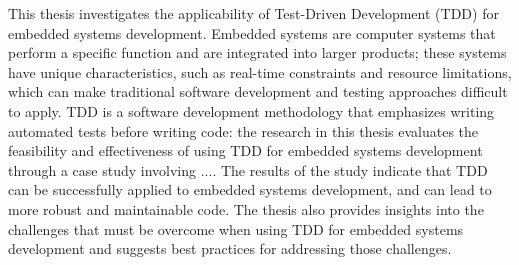 This thesis investigates the applicability of Test-Driven Development (TDD) for embedded systems development. Embedded systems are computer systems that perform a specific function and are integrated into larger products; these systems have unique characteristics, such as real-time constraints and resource limitations, which can make traditional software development and testing approaches difficult to apply. TDD is a software development methodology that emphasizes writing automated tests before writing code: the research in this thesis evaluates the feasibility and effectiveness of using TDD for embedded systems development through a case study involving .... 
The results of the study indicate that TDD can be successfully applied to embedded systems development, and can lead to more robust and maintainable code. The thesis also provides insights into the challenges that must be overcome when using TDD for embedded systems development and suggests best practices for addressing those challenges.